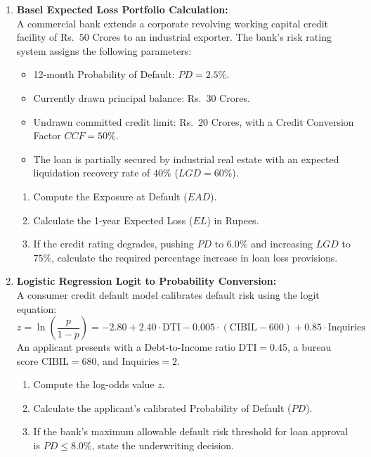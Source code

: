 \begin{enumerate}[label=\textbf{P8.\arabic*}]
    \item \textbf{Basel Expected Loss Portfolio Calculation:}\\
    A commercial bank extends a corporate revolving working capital credit facility of Rs.~$50$ Crores to an industrial exporter. The bank's risk rating system assigns the following parameters:
    \begin{itemize}
        \item 12-month Probability of Default: $PD = 2.5\%$.
        \item Currently drawn principal balance: Rs.~$30$ Crores.
        \item Undrawn committed credit limit: Rs.~$20$ Crores, with a Credit Conversion Factor $CCF = 50\%$.
        \item The loan is partially secured by industrial real estate with an expected liquidation recovery rate of $40\%$ ($LGD = 60\%$).
    \end{itemize}
    \begin{enumerate}[label=(\alph*)]
        \item Compute the Exposure at Default ($EAD$).
        \item Calculate the 1-year Expected Loss ($EL$) in Rupees.
        \item If the credit rating degrades, pushing $PD$ to $6.0\%$ and increasing $LGD$ to $75\%$, calculate the required percentage increase in loan loss provisions.
    \end{enumerate}

    \item \textbf{Logistic Regression Logit to Probability Conversion:}\\
    A consumer credit default model calibrates default risk using the logit equation:
    \begin{equation*}
    z = \ln\left(\frac{p}{1-p}\right) = -2.80 + 2.40 \cdot \text{DTI} - 0.005 \cdot (\text{CIBIL} - 600) + 0.85 \cdot \text{Inquiries}
    \end{equation*}
    An applicant presents with a Debt-to-Income ratio $\text{DTI} = 0.45$, a bureau score $\text{CIBIL} = 680$, and $\text{Inquiries} = 2$.
    \begin{enumerate}[label=(\alph*)]
        \item Compute the log-odds value $z$.
        \item Calculate the applicant's calibrated Probability of Default ($PD$).
        \item If the bank's maximum allowable default risk threshold for loan approval is $PD \le 8.0\%$, state the underwriting decision.
    \end{enumerate}


\end{enumerate}
